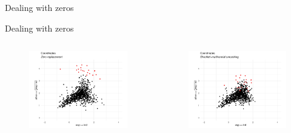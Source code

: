 \documentclass[9pt]{beamer}
\begin{document}
\begin{frame}{Dealing with zeros}
\end{frame}

\begin{frame}[t]{Dealing with zeros}

\begin{columns}
\begin{column}{0.5\textwidth}
\begin{figure}\vspace{-0.20cm}
\includegraphics[trim=0cm 0cm 0cm 0cm,width=\textwidth]{coordinates_zr.pdf}
\end{figure}
\end{column}
\begin{column}{0.5\textwidth}
\begin{figure}\vspace{-0.20cm}
\includegraphics[trim=0cm 0cm 0cm 0cm,width=\textwidth]{coordinates_nz.pdf}
\end{figure}
\end{column}
\end{columns}



\end{frame}
\end{document}
